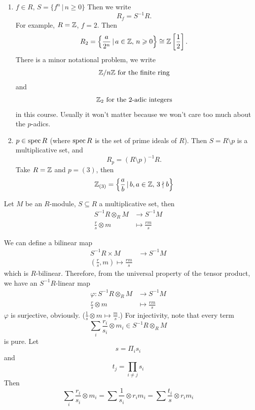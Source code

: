 \documentclass{article}
\begin{document}
\begin{ex}\hspace{0.1cm}
    \begin{enumerate}
        \item $f \in R$, $S = \{ f^{n} \, | \, n \geq0\}$ Then we write \[ R_{f} = S^{-1}R.\] For example, $R= \mathbb{Z}$, $f= 2$. Then \[ R_{2} = \left\{ \frac{a}{2^{n}} \, | \, a \in \mathbb{Z}, \, n \geqslant 0 \right\} \cong \mathbb{Z}\left[ \frac{1}{2} \right]. \]
        There is a minor notational problem, we write \[ \mathbb{Z} / n\mathbb{Z} \text{ for the finite ring} \] and \[ \mathbb{Z}_{2} \text{ for the $2$-adic integers} \] in this course. Usually it won't matter because we won't care too much about the $p$-adics.
        \item $p \in \operatorname{spec} R$ (where $\operatorname{spec} R$ is the set of prime ideals of $R$). Then $S=R\setminus p$ is a multiplicative set, and \[ R_{p} = (R\setminus p)^{-1}R.\] Take $R = \mathbb{Z}$ and $p=(3)$, then \[ \mathbb{Z}_{(3)}=\left\{ \frac{a}{b} \, | \, b,a \in \mathbb{Z}, \, 3 \nmid b \right\} \]
    \end{enumerate}
\end{ex}
\begin{fancyprop}{}
    Let $M$ be an $R$-module, $S \subseteq R$ a multiplicative set, then 
    \begin{align*}
        S^{-1}R \otimes_{R} M &\to S^{-1}M\\
        \frac{r}{s} \otimes m &\mapsto \frac{rm}{s}
    \end{align*}
\end{fancyprop}
\proof We can define a bilinear map \begin{align*}
     S^{-1}R \times M &\to S^{-1}M\\
     \left( \frac{r}{s}, m \right) \mapsto \frac{rm}{s}
\end{align*} which is $R$-bilinear. Therefore, from the universal property of the tensor product, we have an $S^{-1}R$-linear map \begin{align*}
    \varphi : S^{-1}R \otimes_{R} M &\to S^{-1}M\\
    \frac{r}{s} \otimes m &\mapsto \frac{rm}{s}
\end{align*}
$\varphi$ is surjective, obviously. ($\frac{1}{s} \otimes m \mapsto \frac{m}{s}$.) \gap For injectivity, note that every term \[ \sum_{i} \frac{r_{i}}{s_{i}} \otimes m_{i} \in S^{-1}R \otimes_{R} M \] is pure. Let \[ s= \Pi_{i} s_{i} \] and \[ t_{j} = \prod_{i \neq j} s_{i} \] Then \[ \sum_{i} \frac{r_{i}}{s_{i}} \otimes m_{i} = \sum \frac{1}{s_{i}} \otimes r_{i}m_{i} = \sum \frac{t_{i}}{s} \otimes r_{i}m_{i}\] 
\end{document}
